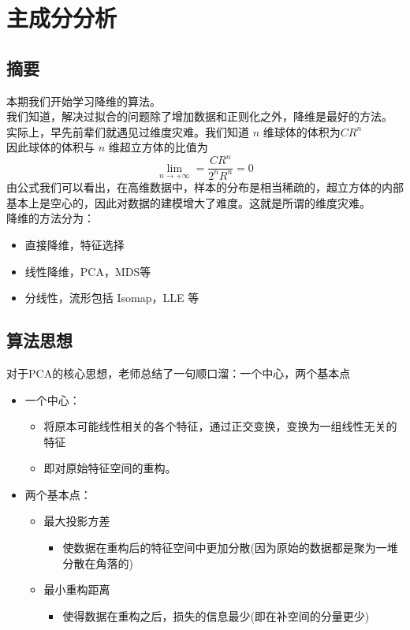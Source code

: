 \documentclass{report}
\begin{document}
\chapter{主成分分析}
\section{摘要}
本期我们开始学习降维的算法。\\
我们知道，解决过拟合的问题除了增加数据和正则化之外，降维是最好的方法。\\
实际上，早先前辈们就遇见过维度灾难。我们知道 $n$ 维球体的体积为$CR^n$\\
因此球体的体积与 $n$ 维超立方体的比值为
$$
\lim_{n \to +\infty}=\frac{CR^n}{2^n R^n}=0
$$
由公式我们可以看出，在高维数据中，样本的分布是相当稀疏的，超立方体的内部基本上是空心的，因此对数据的建模增大了难度。这就是所谓的维度灾难。\\
降维的方法分为：
\begin{itemize}
	\item 直接降维，特征选择
	\item 线性降维，PCA，MDS等
	\item 分线性，流形包括 Isomap，LLE 等
\end{itemize}
\section{算法思想}
对于PCA的核心思想，老师总结了一句顺口溜：一个中心，两个基本点
\begin{itemize}
	\item 一个中心：
	\begin{itemize}
	\item 将原本可能线性相关的各个特征，通过正交变换，变换为一组线性无关的特征
	\item 即对原始特征空间的重构。
	\end{itemize}
	\item 两个基本点：
	\begin{itemize}
	\item 最大投影方差
	\begin{itemize}
	\item 使数据在重构后的特征空间中更加分散(因为原始的数据都是聚为一堆分散在角落的)
	\end{itemize}
	\item 最小重构距离
	\begin{itemize}
	\item 使得数据在重构之后，损失的信息最少(即在补空间的分量更少)
	\end{itemize}
	\end{itemize}
\end{itemize}
\end{document}
